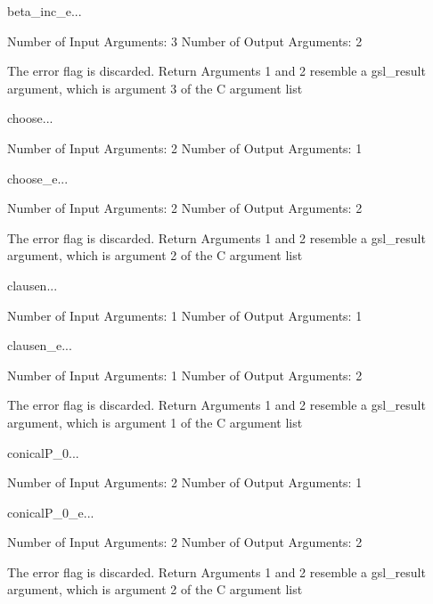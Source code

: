 \begin{funcdesc}{beta_inc_e}{...}

    Number of Input  Arguments:  3
    Number of Output Arguments:  2

The error flag is discarded.
Return Arguments 1 and 2 resemble a gsl_result argument,
	which is  argument 3 of the C argument list

\end{funcdesc}

\begin{funcdesc}{choose}{...}

    Number of Input  Arguments:  2
    Number of Output Arguments:  1
\end{funcdesc}

\begin{funcdesc}{choose_e}{...}

    Number of Input  Arguments:  2
    Number of Output Arguments:  2

The error flag is discarded.
Return Arguments 1 and 2 resemble a gsl_result argument,
	which is  argument 2 of the C argument list

\end{funcdesc}

\begin{funcdesc}{clausen}{...}

    Number of Input  Arguments:  1
    Number of Output Arguments:  1
\end{funcdesc}

\begin{funcdesc}{clausen_e}{...}

    Number of Input  Arguments:  1
    Number of Output Arguments:  2

The error flag is discarded.
Return Arguments 1 and 2 resemble a gsl_result argument,
	which is  argument 1 of the C argument list

\end{funcdesc}

\begin{funcdesc}{conicalP_0}{...}

    Number of Input  Arguments:  2
    Number of Output Arguments:  1
\end{funcdesc}

\begin{funcdesc}{conicalP_0_e}{...}

    Number of Input  Arguments:  2
    Number of Output Arguments:  2

The error flag is discarded.
Return Arguments 1 and 2 resemble a gsl_result argument,
	which is  argument 2 of the C argument list

\end{funcdesc}

